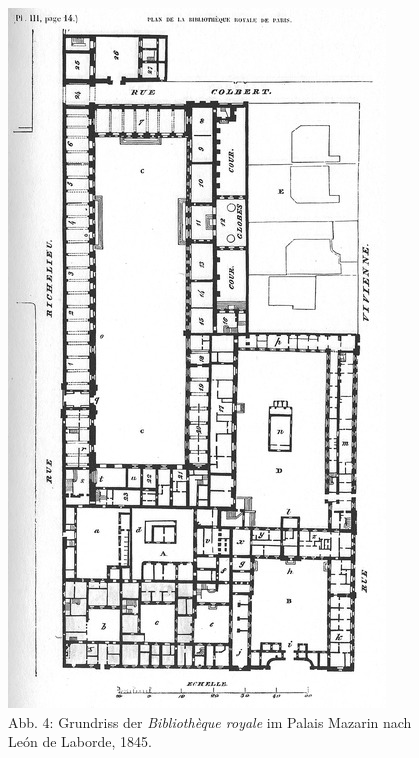 \begin{figure}[htbp]
\centering
\includegraphics{img/wagner-4.jpg}
\caption*{Abb. 4: Grundriss der \emph{Bibliothèque royale} im Palais
Mazarin nach León de Laborde, 1845.}
\end{figure}

